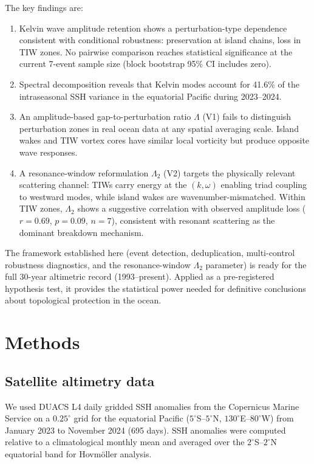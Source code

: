 \documentclass[11pt]{article}
\begin{document}
The key findings are:
\begin{enumerate}
\item Kelvin wave amplitude retention shows a perturbation-type dependence consistent with conditional robustness: preservation at island chains, loss in TIW zones. No pairwise comparison reaches statistical significance at the current 7-event sample size (block bootstrap 95\% CI includes zero).
\item Spectral decomposition reveals that Kelvin modes account for 41.6\% of the intraseasonal SSH variance in the equatorial Pacific during 2023--2024.
\item An amplitude-based gap-to-perturbation ratio $\Lambda$ (V1) fails to distinguish perturbation zones in real ocean data at any spatial averaging scale. Island wakes and TIW vortex cores have similar local vorticity but produce opposite wave responses.
\item A resonance-window reformulation $\Lambda_2$ (V2) targets the physically relevant scattering channel: TIWs carry energy at the $(k, \omega)$ enabling triad coupling to westward modes, while island wakes are wavenumber-mismatched. Within TIW zones, $\Lambda_2$ shows a suggestive correlation with observed amplitude loss ($r = 0.69$, $p = 0.09$, $n = 7$), consistent with resonant scattering as the dominant breakdown mechanism.
\end{enumerate}

The framework established here (event detection, deduplication, multi-control robustness diagnostics, and the resonance-window $\Lambda_2$ parameter) is ready for the full 30-year altimetric record (1993--present). Applied as a pre-registered hypothesis test, it provides the statistical power needed for definitive conclusions about topological protection in the ocean.

\section{Methods}
\label{sec:methods}

\subsection{Satellite altimetry data}

We used DUACS L4 daily gridded SSH anomalies\cite{Duacs2016} from the Copernicus Marine Service on a $0.25^\circ$ grid for the equatorial Pacific ($5^\circ$S--$5^\circ$N, $130^\circ$E--$80^\circ$W) from January 2023 to November 2024 (695 days). SSH anomalies were computed relative to a climatological monthly mean and averaged over the $2^\circ$S--$2^\circ$N equatorial band for Hovm\"oller analysis.
\end{document}

